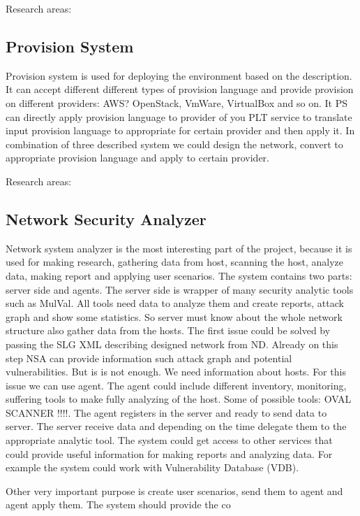 \documentclass[twoside]{article}
\newcommand{\myPS}{Provision System}
\newcommand{\myNSA}{Network Security Analyzer}
\begin{document}
     
Research areas:     

\subsection{\myPS}
Provision system is used for deploying the environment based on the description. It can accept different different types of provision language and provide provision on different providers: AWS? OpenStack, VmWare, VirtualBox and so on. It PS can directly apply provision language to provider of you PLT service to translate input provision language to appropriate for certain provider and then apply it. In combination of three described system we could design the network, convert to appropriate provision language and apply to certain provider. 

Research areas:


\subsection{\myNSA}
Network system analyzer is the most interesting part of the project, because it is used for making research, gathering data from host, scanning the host, analyze data, making report and applying user scenarios. The system contains two parts: server side and agents. The server side is wrapper of many security analytic tools such as MulVal. All tools need data to analyze them and create reports, attack graph and show some statistics. So server must  know about the whole network structure also gather data from the hosts. The first issue could be solved by passing the SLG XML describing designed network from ND. Already on this step NSA can provide information such attack graph and potential vulnerabilities. But is is not enough. We need information about hosts. For this issue we can use agent. The agent could include different inventory, monitoring, suffering tools to make fully analyzing of the host. Some of possible tools: OVAL SCANNER !!!!. The agent registers in the server and ready to send data to server. The server receive data and depending on the time delegate them to the appropriate analytic tool. The system could get access to other services that could provide useful information for making reports and analyzing data. For example the system could work with Vulnerability Database (VDB). 

Other very important purpose is create user scenarios, send them to agent and agent apply them. The system should provide the co     
\end{document}
